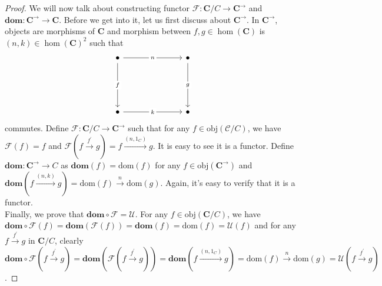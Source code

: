 \documentclass[a4paper, 11pt]{book}
\theoremstyle{plain}
\theoremstyle{plain}
\newcommand{\mb}{\mathbf}
\newcommand{\arr}{\rightarrow}
\newcommand{\dom}{\text{dom}}
\newcommand{\p}{\prime}
\newcommand{\obj}{\text{obj}}
\newcommand{\mc}{\mathcal}
\newcommand{\warr}{\xrightarrow}
\newcommand{\C}{\mathbf{C}}
\begin{document}
\begin{proof}
    We will now talk about constructing functor $\mc{F}:\mb{C}/C \arr \mb{C}^\arr$ and $\mb{dom}:\mb{C}^\arr \arr \mb{C}$. Before we get into it, let us first discuss about $\mb{C}^\arr$. In $\mb{C}^\arr$, objects are morphisms of $\C$ and morphism between $f,g \in \hom(\C)$ is $(n,k) \in \hom(\C)^2$ such that 
    \[\begin{tikzcd}
      \bullet &&& \bullet \\
      \\
      \\
      \bullet &&& \bullet
      \arrow["n"{description}, from=1-1, to=1-4]
      \arrow["f"{description}, from=1-1, to=4-1]
      \arrow["g"{description}, from=1-4, to=4-4]
      \arrow["k"{description}, from=4-1, to=4-4]
    \end{tikzcd}\]
    commutes. Define $\mc{F}:\mb{C}/C \arr \mb{C}^\arr$ such that for any $f \in \obj(\mc{C}/C)$, we have $\mc{F}(f)=f$ and $\mc{F}(f \warr{f^\p} g)=f \warr{(n, 1_C)} g$. It is easy to see it is a functor. Define $\mb{dom}:\mb{C}^\arr \arr C$ as $\mb{dom}(f)=\dom(f)$ for any $f \in \obj(\mb{C}^\arr)$ and $\mb{dom}(f \warr{(n,k)} g)=\dom(f) \warr{n} \dom(g)$. Again, it's easy to verify that it is a functor. \\

    Finally, we prove that $\mb{dom} \circ \mc{F}=\mc{U}$. For any $f \in \obj(\C/C)$, we have $\mb{dom} \circ \mc{F}(f)=\mb{dom} (\mc{F}(f))=\mb{dom}(f)=\dom(f)=\mc{U}(f)$ and for any $f \warr{f^\p} g$ in $\C/C$, clearly $\mb{dom} \circ \mc{F} ( f \warr{f^\p} g)=\mb{dom}( \mc{F} ( f \warr{f^\p} g))=\mb{dom}( f \warr{(n, 1_C)} g)=\dom(f) \warr{n} \dom(g)=\mc{U}(f \warr{f^\p} g )$.
  \end{proof}
\end{document}
